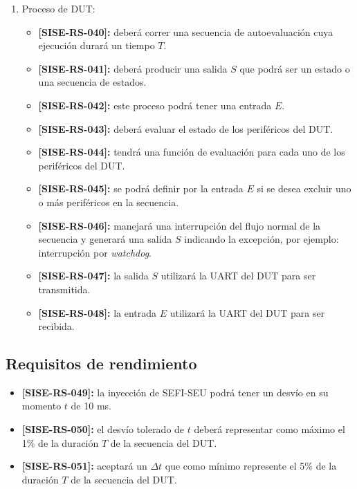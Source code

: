 \documentclass[
11pt, %
codirector, %
]{charter}
\def\codigo{SISE-RS}
\newcommand{\req}[1]{\textbf{[\codigo-#1]:}}
\begin{document}
\begin{enumerate}
\begin{itemize}
			\item \req{037} Se generará un archivo de histogramas llamado \\ \texttt{histogramas-AAAAMMDDHHmm.his} siendo AAAA el año del ensayo, MM el mes, DD el día, HH la hora y mm los minutos.
			\item \req{038} El archivo de histogramas tendrá una tabla que indique la frecuencia de fallos como función de los SEFIs por registro del DUT.
			\item \req{039} El archivo de histogramas tendrá una tabla que indique la frecuencia de fallos como función de los SEFIs por periférico del DUT.
		\end{itemize}
	\item Proceso de DUT:
		\begin{itemize}
			\item \req{040} deberá correr una secuencia de autoevaluación cuya ejecución durará un tiempo $ T $.
			\item \req{041} deberá producir una salida $ S $ que podrá ser un estado o una secuencia de estados.
			\item \req{042} este proceso podrá tener una entrada $ E $.
			\item \req{043} deberá evaluar el estado de los periféricos del DUT.
			\item \req{044} tendrá una función de evaluación para cada uno de los periféricos del DUT.
			\item \req{045} se podrá definir por la entrada $ E $ si se desea excluir uno o más periféricos en la secuencia.
			\item \req{046} manejará una interrupción del flujo normal de la secuencia y generará una salida $ S $ indicando la excepción, por ejemplo: interrupción por \emph{watchdog}.
			\item \req{047} la salida $ S $ utilizará la UART del DUT para ser transmitida.
			\item \req{048} la entrada $ E $ utilizará la UART del DUT para ser recibida.
		\end{itemize}
\end{enumerate}

\subsection{Requisitos de rendimiento}
\label{sub:rendimiento}

\begin{itemize}
	\item \req{049} la inyección de SEFI-SEU podrá tener un desvío en su momento $ t $ de 10 ms.
	\item \req{050} el desvío tolerado de $ t $ deberá representar como máximo el 1\% de la duración $ T $ de la secuencia del DUT.
	\item \req{051} aceptará un $ \Delta t $ que como mínimo represente el 5\% de la duración $ T $ de la secuencia del DUT.
\end{itemize}
\end{document}
